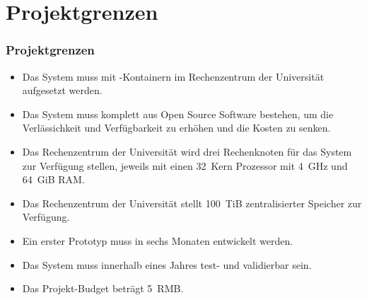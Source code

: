 \documentclass[aspectratio=169,mathserif,notheorems]{beamer}%
\begin{document}
\section{Projektgrenzen}%
%
\begin{frame}%
\frametitle{Projektgrenzen}%
\begin{itemize}%
\item Das System muss mit \docker-Kontainern im Rechenzentrum der Universität aufgesetzt werden.%
%
\item<2-> Das System muss komplett aus Open Source Software bestehen, um die Verlässichkeit und Verfügbarkeit zu erhöhen und die Kosten zu senken.%
%
\item<3-> Das Rechenzentrum der Universität wird drei Rechenknoten für das System zur Verfügung stellen, jeweils mit einen 32~Kern Prozessor mit 4~GHz und 64~GiB RAM.%
%
\item<4-> Das Rechenzentrum der Universität stellt 100~TiB zentralisierter Speicher zur Verfügung.%
%
\item<5-> Ein erster Prototyp muss in sechs Monaten entwickelt werden.%
%
\item<6-> Das System muss innerhalb eines Jahres test- und validierbar sein.%
%
\item<7-> Das Projekt-Budget beträgt 5~RMB.%
\end{itemize}%
\end{frame}%
%
\end{document}
